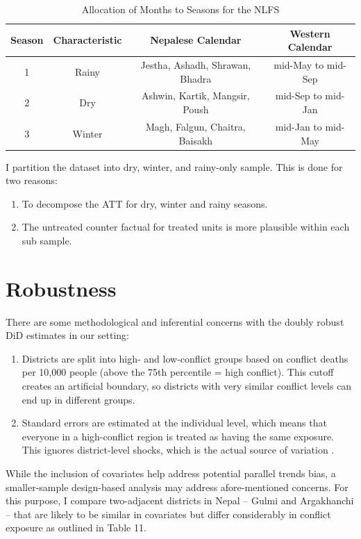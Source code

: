 \documentclass[12pt,a4paper]{article}
\begin{document}
\begin{table}[ht]
	
	\caption{Allocation of Months to Seasons for the NLFS}
	\renewcommand{\arraystretch}{1.2}
	\vspace{1em}
	\centering{}%
	\begin{tabular}{|c|c|c|c|}
		\hline
		\textbf{Season} & \textbf{Characteristic}& \textbf{Nepalese Calendar} & \textbf{Western Calendar}\\
		\hline
		1& Rainy & Jestha, Ashadh, Shrawan, Bhadra & mid-May to mid-Sep\\
		\hline
		2& Dry & Ashwin, Kartik, Mangsir, Poush & mid-Sep to mid-Jan \\
		\hline
		3& Winter & Magh, Falgun, Chaitra, Baisakh &  mid-Jan to mid-May\\
		\hline
	\end{tabular}
\end{table}

I partition the dataset into dry, winter, and rainy-only sample. This is done for two reasons:

\begin{enumerate}
	\item To decompose the ATT for dry, winter and rainy seasons.
	\item The untreated counter factual for treated units is more plausible within each sub sample.
\end{enumerate}







\section{Robustness}
There are some methodological and inferential concerns with the doubly robust DiD estimates in our setting:

\begin{enumerate}
	\item Districts are split into high- and low-conflict groups based on conflict deaths per 10,000 people (above the 75th percentile = high conflict). This cutoff creates an artificial boundary, so districts with very similar conflict levels can end up in different groups.
	\item Standard errors are estimated at the individual level, which means that everyone in a high-conflict region is treated as having the same exposure. This ignores district-level shocks, which is the actual source of variation \parencite{bertrand2004much}.
\end{enumerate}
While the inclusion of covariates help address potential parallel trends bias, a smaller-sample design-based analysis may address afore-mentioned concerns. For this purpose, I compare two-adjacent districts in Nepal -- Gulmi and Argakhanchi -- that are likely to be similar in covariates but differ considerably in conflict exposure as outlined in Table 11.
\end{document}
